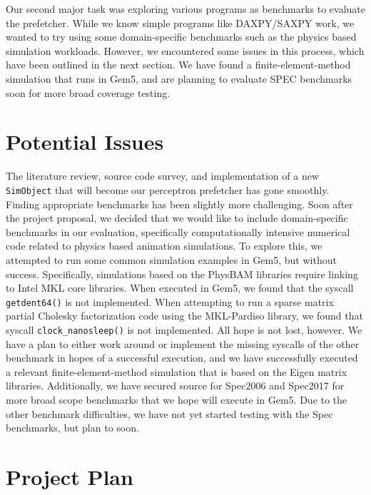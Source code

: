 \documentclass[conference]{IEEEtran}
\begin{document}
Our second major task was exploring various programs as benchmarks to evaluate the prefetcher.  While we know simple programs like DAXPY/SAXPY work, we wanted to try using some domain-specific benchmarks such as the physics based simulation workloads. However, we encountered some issues in this process, which have been outlined in the next section. We have found a finite-element-method simulation that runs in Gem5, and are planning to evaluate SPEC benchmarks soon for more broad coverage testing.

\section{Potential Issues}
The literature review, source code survey, and implementation of a new \texttt{SimObject} that will become our perceptron prefetcher has gone smoothly. Finding appropriate benchmarks has been slightly more challenging.  Soon after the project proposal, we decided that we would like to include domain-specific benchmarks in our evaluation, specifically computationally intensive numerical code related to physics based animation simulations. To explore this, we attempted to run some common simulation examples in Gem5, but without success. Specifically, simulations based on the PhysBAM libraries require linking to Intel MKL core libraries. When executed in Gem5, we found that the syscall \texttt{getdent64()} is not implemented. When attempting to run a sparse matrix partial Cholesky factorization code using the MKL-Pardiso library, we found that syscall \texttt{clock\_nanosleep()} is not implemented. All hope is not lost, however. We have a plan to either work around or implement the missing syscalls of the other benchmark in hopes of a successful execution, and we have successfully executed a relevant finite-element-method simulation that is based on the Eigen matrix libraries. Additionally, we have secured source for Spec2006 and Spec2017 for more broad scope benchmarks that we hope will execute in Gem5. Due to the other benchmark difficulties, we have not yet started testing with the Spec benchmarks, but plan to soon. 

\section{Project Plan}
\end{document}
